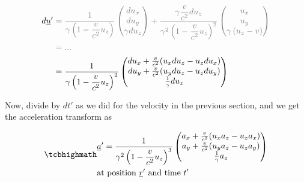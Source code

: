 \begin{equation}
	\begin{aligned}
		d\underline{u}{'} & \color{gray} = \dfrac{1}{{\gamma}\left(1-\dfrac{v}{{c}^2} {u_z}\right) }
		\begin{pmatrix}
			d{u_x}          \\
			d{u_y}          \\
			{\gamma} d{u_z} \\
		\end{pmatrix}
		+ \dfrac{{\gamma} \dfrac{v}{{c}^2} d{u_z}}{{\gamma}^2\left(1-\dfrac{v}{{c}^2} {u_z}\right)^2 }
		\begin{pmatrix}
			{u_x}                              \\
			{u_y}                              \\
			{\gamma} \left( {u_z}- {v} \right) \\
		\end{pmatrix}                                                           \\
		                  & \color{gray} = ...
		\\
		                  & = \dfrac{1}{{\gamma}\left(1-\dfrac{v}{{c}^2} {u_z}\right)^2 }
		\begin{pmatrix}
			d{u_x} + \frac{v}{{c}^2}( {u_x} d{u_z}-{u_z} d{u_x}) \\
			d{u_y} + \frac{v}{{c}^2}( {u_y} d{u_z}-{u_z} d{u_y}) \\
			\frac{1}{{\gamma}} d{u_z}                            \\
		\end{pmatrix}
	\end{aligned}
\end{equation}

Now, divide by ${dt{'}}$ as we did for the velocity in the previous section, and we get the acceleration transform as

\begin{equation}
	\mhl{
		\begin{aligned}
			 & \underline{a}{'} = \dfrac{1}{{\gamma}^2\left(1-\dfrac{v}{{c}^2} {u_z}\right)^3 }
			\begin{pmatrix}
				{{a}_{x}} + \frac{v}{{c}^2}({u_x} {{a}_{z}}-{u_z} {{a}_{x}}) \\
				{{a}_{y}} + \frac{v}{{c}^2}({u_y} {{a}_{z}}-{u_z} {{a}_{y}}) \\
				\frac{1}{{\gamma}} {{a}_{z}}                                 \\
			\end{pmatrix}
			\\
			 & \text{at position ${\underline{r}{'}}$ and time ${t{'}}$ }
		\end{aligned}
	}
	\label{eq: acceleration transform}
\end{equation}


